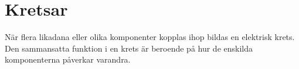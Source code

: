 \chapter{Kretsar}
\label{ch:kretsar}

När flera likadana eller olika komponenter kopplas ihop bildas en elektrisk
krets.
Den sammansatta funktion i en krets är beroende på hur de enskilda komponenterna
påverkar varandra.
 